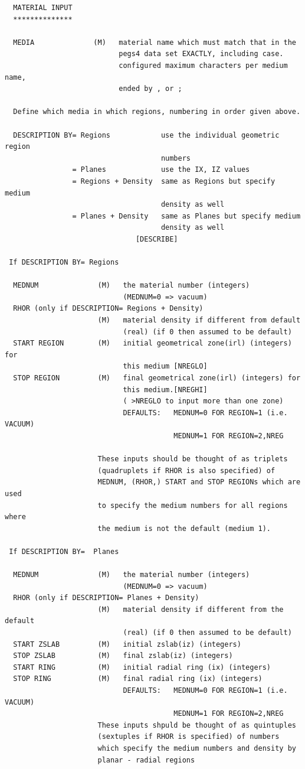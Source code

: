 \documentclass[12pt,twoside]{article}  %
\begin{document}
\begin{verbatim}
  MATERIAL INPUT
  **************

  MEDIA              (M)   material name which must match that in the
                           pegs4 data set EXACTLY, including case.
                           configured maximum characters per medium name,
                           ended by , or ;

  Define which media in which regions, numbering in order given above.

  DESCRIPTION BY= Regions            use the individual geometric region
                                     numbers
                = Planes             use the IX, IZ values
                = Regions + Density  same as Regions but specify medium
                                     density as well
                = Planes + Density   same as Planes but specify medium
                                     density as well
                               [DESCRIBE]

 If DESCRIPTION BY= Regions

  MEDNUM              (M)   the material number (integers)
                            (MEDNUM=0 => vacuum)
  RHOR (only if DESCRIPTION= Regions + Density)
                      (M)   material density if different from default
                            (real) (if 0 then assumed to be default)
  START REGION        (M)   initial geometrical zone(irl) (integers) for
                            this medium [NREGLO]
  STOP REGION         (M)   final geometrical zone(irl) (integers) for
                            this medium.[NREGHI]
                            ( >NREGLO to input more than one zone)
                            DEFAULTS:   MEDNUM=0 FOR REGION=1 (i.e. VACUUM)
                                        MEDNUM=1 FOR REGION=2,NREG

                      These inputs should be thought of as triplets
                      (quadruplets if RHOR is also specified) of
                      MEDNUM, (RHOR,) START and STOP REGIONs which are used
                      to specify the medium numbers for all regions where
                      the medium is not the default (medium 1).

 If DESCRIPTION BY=  Planes

  MEDNUM              (M)   the material number (integers)
                            (MEDNUM=0 => vacuum)
  RHOR (only if DESCRIPTION= Planes + Density)
                      (M)   material density if different from the default
                            (real) (if 0 then assumed to be default)
  START ZSLAB         (M)   initial zslab(iz) (integers)
  STOP ZSLAB          (M)   final zslab(iz) (integers)
  START RING          (M)   initial radial ring (ix) (integers)
  STOP RING           (M)   final radial ring (ix) (integers)
                            DEFAULTS:   MEDNUM=0 FOR REGION=1 (i.e. VACUUM)
                                        MEDNUM=1 FOR REGION=2,NREG
                      These inputs shpuld be thought of as quintuples
                      (sextuples if RHOR is specified) of numbers
                      which specify the medium numbers and density by
                      planar - radial regions
\end{verbatim}
\end{document}
